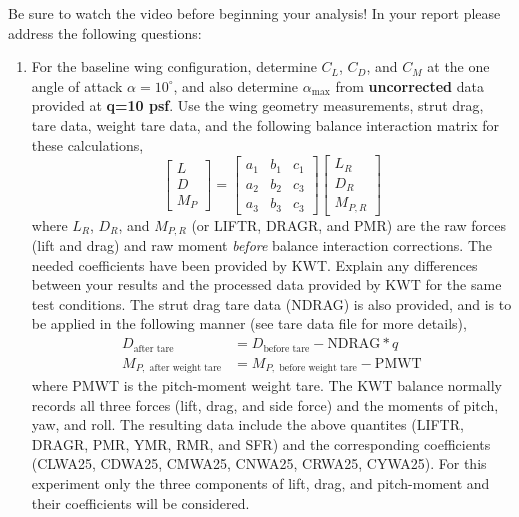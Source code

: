 \documentclass[12pt]{article}
\begin{document}
Be sure to watch the video before beginning your analysis!
\newpage
In your report please address the following questions:
\begin{enumerate}[noitemsep]
\item For the baseline wing configuration, determine $C_L$, $C_D$, and $C_M$ at the one angle of attack $\alpha = 10^\circ$, and also determine $\alpha_{\text{max}}$ from \textbf{uncorrected} data provided at \textbf{q=10 psf}. Use the wing geometry measurements, strut drag, tare data, weight tare data, and the following balance interaction matrix for these calculations,
  \begin{equation}
    \begin{bmatrix} L\\ D\\ M_P\end{bmatrix} = \begin{bmatrix} a_1 & b_1 & c_1\\ a_2 & b_2 & c_3\\ a_3 & b_3 & c_3\end{bmatrix}\begin{bmatrix} L_R\\ D_R\\ M_{P,R}\end{bmatrix}
  \end{equation}
  where $L_R$, $D_R$, and $M_{P,R}$ (or LIFTR, DRAGR, and PMR) are the raw forces (lift and drag) and raw moment \textit{before} balance interaction corrections. The needed coefficients have been provided by KWT. Explain any differences between your results and the processed data provided by KWT for the same test conditions. The strut drag tare data (NDRAG) is also provided, and is to be applied in the following manner (see tare data file for more details),
  \begin{align}
    D_{\text{after tare}} &= D_{\text{before tare}} - \text{NDRAG}*q\\
    M_{P,\text{ after weight tare}} &= M_{P,\text{ before weight tare}} - \text{PMWT}
  \end{align}
  where PMWT is the pitch-moment weight tare. The KWT balance normally records all three forces (lift, drag, and side force) and the moments of pitch, yaw, and roll. The resulting data include the above quantites (LIFTR, DRAGR, PMR, YMR, RMR, and SFR) and the corresponding coefficients (CLWA25, CDWA25, CMWA25, CNWA25, CRWA25, CYWA25). For this experiment only the three components of lift, drag, and pitch-moment and their coefficients will be considered.

\end{enumerate}
\end{document}
